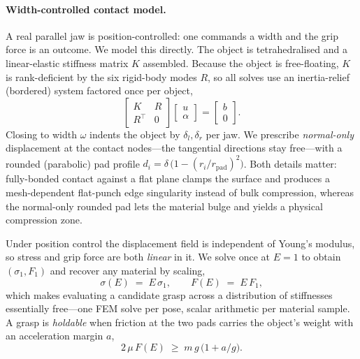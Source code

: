 \paragraph{Width-controlled contact model.}
A real parallel jaw is position-controlled: one commands a width and the grip force is an
outcome. We model this directly. The object is tetrahedralised and a linear-elastic
stiffness matrix $K$ assembled. Because the object is free-floating, $K$ is rank-deficient
by the six rigid-body modes $R$, so all solves use an inertia-relief (bordered) system
factored once per object,
\begin{equation}
  \begin{bmatrix} K & R \\ R^{\!\top} & 0 \end{bmatrix}
  \begin{bmatrix} u \\ \alpha \end{bmatrix}
  =\begin{bmatrix} b \\ 0 \end{bmatrix}.
  \label{eq:inertia-relief}
\end{equation}
Closing to width $\omega$ indents the object by $\delta_{l},\delta_{r}$ per jaw. We prescribe
\emph{normal-only} displacement at the contact nodes---the tangential directions stay
free---with a rounded (parabolic) pad profile $d_i=\delta\,\bigl(1-(r_i/r_{\text{pad}})^2\bigr)$.
Both details matter: fully-bonded contact against a flat plane clamps the surface and
produces a mesh-dependent flat-punch edge singularity instead of bulk compression, whereas
the normal-only rounded pad lets the material bulge and yields a physical compression zone.

Under position control the displacement field is independent of Young's modulus, so stress
and grip force are both \emph{linear} in it. We solve once at $E\!=\!1$ to obtain
$(\sigma_1, F_1)$ and recover any material by scaling,
\begin{equation}
  \sigma(E) \;=\; E\,\sigma_1, \qquad F(E) \;=\; E\,F_1 ,
  \label{eq:E-linear}
\end{equation}
which makes evaluating a candidate grasp across a distribution of stiffnesses essentially
free---one FEM solve per pose, scalar arithmetic per material sample. A grasp is
\emph{holdable} when friction at the two pads carries the object's weight with an
acceleration margin $a$,
\begin{equation}
  2\,\mu\,F(E) \;\ge\; m\,g\,\bigl(1 + a/g\bigr).
  \label{eq:hold}
\end{equation}

